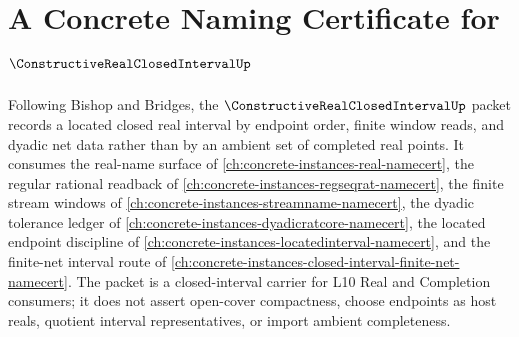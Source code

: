 \chapter{A Concrete Naming Certificate for $\ConstructiveRealClosedIntervalUp$}
\label{ch:concrete-instances-constructive-real-closed-interval-namecert}

Following Bishop and Bridges, the $\ConstructiveRealClosedIntervalUp$ packet records a located closed real interval by endpoint order, finite window reads, and dyadic net data rather than by an ambient set of completed real points. It consumes the real-name surface of \autoref{ch:concrete-instances-real-namecert}, the regular rational readback of \autoref{ch:concrete-instances-regseqrat-namecert}, the finite stream windows of \autoref{ch:concrete-instances-streamname-namecert}, the dyadic tolerance ledger of \autoref{ch:concrete-instances-dyadicratcore-namecert}, the located endpoint discipline of \autoref{ch:concrete-instances-locatedinterval-namecert}, and the finite-net interval route of \autoref{ch:concrete-instances-closed-interval-finite-net-namecert}. The packet is a closed-interval carrier for L10 Real and Completion consumers; it does not assert open-cover compactness, choose endpoints as host reals, quotient interval representatives, or import ambient completeness.

